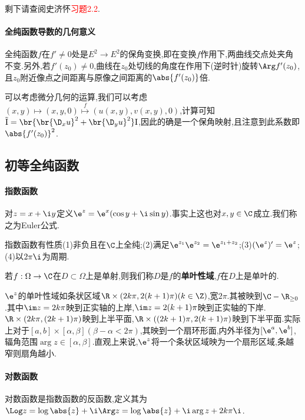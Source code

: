 \documentclass{article}
\newcommand{\exerfunc}[1]{剩下请查阅史济怀\textcolor{red}{习题#1}.}
\begin{document}

\exerfunc{2.2}

\paragraph{全纯函数导数的几何意义}
全纯函数$f$在$f'\neq 0$处是$E^2\to E^2$的保角变换,即在变换$f$作用下,两曲线交点处夹角不变.另外,若$f'(z_0)\neq 0$,曲线在$z_0$处切线的角度在作用下(逆时针)旋转$\Arg f'(z_0)$,且$z_0$附近像点之间距离与原像之间距离的$\abs{f'(z_0)}$倍.

可以考虑微分几何的运算,我们可以考虑$(x,y)\mapsto (x,y,0)\stackrel{f}{\mapsto}(u(x,y),v(x,y),0)$,计算可知$\tilde{\mathrm{I}}=\br{\br{\D_xu}^2+\br{\D_yu}^2}\mathrm{I}$,因此的确是一个保角映射,且注意到此系数即$\abs{f'(z_0)}^2$.

\subsection{初等全纯函数}
\paragraph{指数函数}对$z=x+\i y$定义$\e^z=\e^{x}(\cos y+\i\sin y)$.事实上这也对$x,y\in \C$成立.我们称之为Euler公式.

指数函数有性质(1)非负且在$\C$上全纯;(2)满足$\e^{z_1}\e^{z_2}=\e^{z_1+z_2}$;(3)$(\e^z)'=\e^z$;(4)以$2\pi\i$为周期.

若$f:\Omega\to\C$在$D\subset\Omega$上是单射,则我们称$D$是$f$的\textbf{单叶性域},$f$在$D$上是单叶的.

$\e^z$的单叶性域如条状区域$\R\times(2k\pi,2(k+1)\pi)(k\in \Z)$,宽$2\pi$.其被映到$\C-\R_{\geq 0}$.其中$\im z=2k\pi$映到正实轴的上岸,$\im z=2(k+1)\pi$映到正实轴的下岸.$\R\times (2k\pi,(2k+1)\pi)$映到上半平面,$\R\times((2k+1)\pi,2(k+1)\pi)$映到下半平面.实际上对于$[a,b]\times[\alpha,\beta](\beta-\alpha<2\pi)$,其映到一个扇环形面,内外半径为$[\e^a,\e^b]$,辐角范围$\arg z\in [\alpha,\beta]$.直观上来说,$\e^z$将一个条状区域映为一个扇形区域,条越窄则扇角越小.

\paragraph{对数函数}对数函数是指数函数的反函数,定义其为$\Log z=\log\abs{z}+\i\Arg z=\log\abs{z}+\i\arg z+2k\pi\i$.
\end{document}
